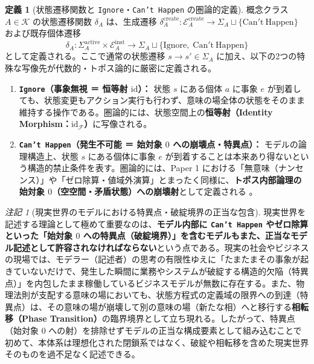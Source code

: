 \documentclass[11pt,a4paper]{ltjsarticle}
\theoremstyle{definition}
\newtheorem{definition}{定義}[section]
\theoremstyle{plain}
\theoremstyle{remark}
\newtheorem{remark}{注記}[section]
\newcommand{\id}{\mathrm{id}}
\begin{document}
\begin{definition}[状態遷移関数と \texttt{Ignore}・\texttt{Can't Happen} の圏論的定義]\label{def:stt}
概念クラス $A \in \mathcal{K}$ の状態遷移関数 $\delta_A$ は、生成遷移 $\delta_A^{\mathrm{create}} : \mathcal{E}_A^{\mathrm{create}} \to \Sigma_A \sqcup \{\mathrm{Can't\ Happen}\}$ および既存個体遷移
\begin{equation}
\delta_A : \Sigma_A^{\mathrm{active}} \times \mathcal{E}_A^{\mathrm{inst}} \longrightarrow \Sigma_A \sqcup \{\mathrm{Ignore},\; \mathrm{Can't\ Happen}\}
\end{equation}
として定義される。ここで通常の状態遷移 $s \to s' \in \Sigma_A$ に加え、以下の2つの特殊な写像先が代数的・トポス論的に厳密に定義される。
\begin{enumerate}
    \item \textbf{\texttt{Ignore}（事象無視 ＝ 恒等射 $\id$）：} 状態 $s$ にある個体 $a$ に事象 $e$ が到着しても、状態変更もアクション実行も行わず、意味の場全体の状態をそのまま維持する操作である。圏論的には、状態空間上の\textbf{恒等射（Identity Morphism：$\id_{\mathcal{F}}$）}に写像される。
    \item \textbf{\texttt{Can't Happen}（発生不可能 ＝ 始対象 $0$ への崩壊点・特異点）：} モデルの論理構造上、状態 $s$ にある個体に事象 $e$ が到着することは本来あり得ないという構造的禁止条件を表す。圏論的には、Paper 1 における「無意味（ナンセンス）」や「ゼロ除算・値域外演算」とまったく同様に、\textbf{トポス内部論理の始対象 $0$（空空間・矛盾状態）への崩壊射}として定義される \cite{maclane1992}。
\end{enumerate}
\end{definition}

\begin{remark}[現実世界のモデルにおける特異点・破綻境界の正当な包含]\label{rem:singularities}
現実世界を記述する理論として極めて重要なのは、\textbf{モデル内部に \texttt{Can't Happen} やゼロ除算といった「始対象 $0$ への特異点（破綻境界）」を含むモデルもまた、正当なモデル記述として許容されなければならない}という点である。現実の社会やビジネスの現場では、モデラー（記述者）の思考の有限性ゆえに「たまたまその事象が起きていないだけで、発生した瞬間に業務やシステムが破綻する構造的欠陥（特異点）」を内包したまま稼働しているビジネスモデルが無数に存在する。また、物理法則が支配する意味の場においても、状態方程式の定義域の限界への到達（特異点）は、その意味の場が崩壊して別の意味の場（新たな相）へと移行する\textbf{相転移（Phase Transition）}の臨界境界として立ち現れる。したがって、特異点（始対象 $0$ への射）を排除せずモデルの正当な構成要素として組み込むことで初めて、本体系は理想化された閉鎖系ではなく、破綻や相転移を含めた現実世界そのものを過不足なく記述できる。
\end{remark}
\end{document}
